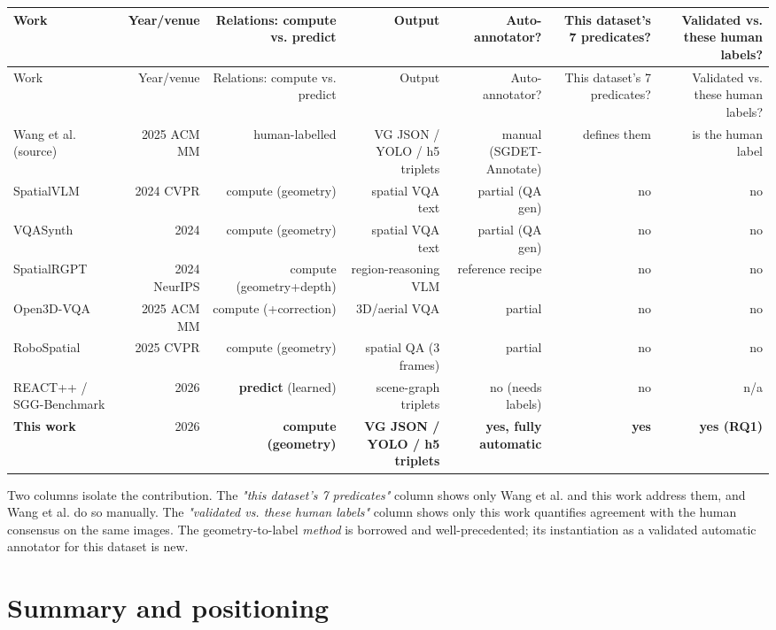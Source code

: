 \begin{center}
\small
\begin{longtable}{lrrrrrr}
\hline
Work & Year/venue & Relations: compute vs. predict & Output & Auto-annotator? & This dataset's 7 predicates? & Validated vs. these human labels? \\
\hline
\endfirsthead
\hline
Work & Year/venue & Relations: compute vs. predict & Output & Auto-annotator? & This dataset's 7 predicates? & Validated vs. these human labels? \\
\hline
\endhead
Wang et al. (source) & 2025 ACM MM & human-labelled & VG JSON / YOLO / h5 triplets & manual (SGDET-Annotate) & defines them & is the human label \\
SpatialVLM & 2024 CVPR & compute (geometry) & spatial VQA text & partial (QA gen) & no & no \\
VQASynth & 2024 & compute (geometry) & spatial VQA text & partial (QA gen) & no & no \\
SpatialRGPT & 2024 NeurIPS & compute (geometry+depth) & region-reasoning VLM & reference recipe & no & no \\
Open3D-VQA & 2025 ACM MM & compute (+correction) & 3D/aerial VQA & partial & no & no \\
RoboSpatial & 2025 CVPR & compute (geometry) & spatial QA (3 frames) & partial & no & no \\
REACT++ / SGG-Benchmark & 2026 & \textbf{predict} (learned) & scene-graph triplets & no (needs labels) & no & n/a \\
\textbf{This work} & 2026 & \textbf{compute (geometry)} & \textbf{VG JSON / YOLO / h5 triplets} & \textbf{yes, fully automatic} & \textbf{yes} & \textbf{yes (RQ1)} \\
\hline
\end{longtable}
\end{center}

Two columns isolate the contribution. The \textit{"this dataset's 7 predicates"} column shows only Wang et al. and this work address them, and Wang et al. do so manually. The \textit{"validated vs. these human labels"} column shows only this work quantifies agreement with the human consensus on the same images. The geometry-to-label \textit{method} is borrowed and well-precedented; its instantiation as a validated automatic annotator for this dataset is new.

\section{Summary and positioning}

